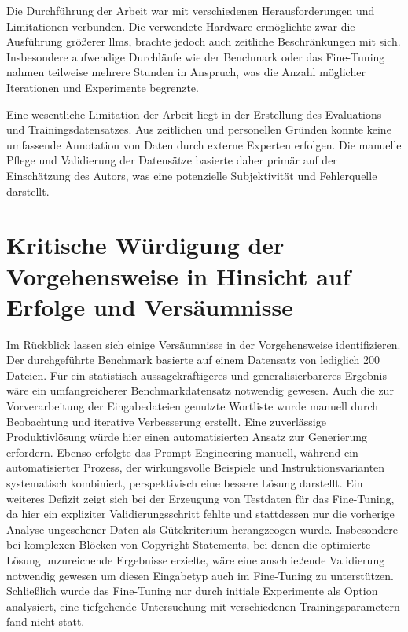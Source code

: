 Die Durchführung der Arbeit war mit verschiedenen Herausforderungen und Limitationen verbunden.
Die verwendete Hardware ermöglichte zwar die Ausführung größerer \glspl{llm}, brachte jedoch auch zeitliche Beschränkungen mit sich.
Insbesondere aufwendige Durchläufe wie der Benchmark oder das Fine-Tuning nahmen teilweise mehrere Stunden in Anspruch, was die Anzahl möglicher Iterationen und Experimente begrenzte.

Eine wesentliche Limitation der Arbeit liegt in der Erstellung des Evaluations- und Trainingsdatensatzes.
Aus zeitlichen und personellen Gründen konnte keine umfassende Annotation von Daten durch externe Experten erfolgen.
Die manuelle Pflege und Validierung der Datensätze basierte daher primär auf der Einschätzung des Autors, was eine potenzielle Subjektivität und Fehlerquelle darstellt.


\section{Kritische Würdigung der Vorgehensweise in Hinsicht auf Erfolge und Versäumnisse}

Im Rückblick lassen sich einige Versäumnisse in der Vorgehensweise identifizieren.
Der durchgeführte Benchmark basierte auf einem Datensatz von lediglich \num{200} Dateien.
Für ein statistisch aussagekräftigeres und generalisierbareres Ergebnis wäre ein umfangreicherer Benchmarkdatensatz notwendig gewesen.
Auch die zur Vorverarbeitung der Eingabedateien genutzte Wortliste wurde manuell durch Beobachtung und iterative Verbesserung erstellt.
Eine zuverlässige Produktivlösung würde hier einen automatisierten Ansatz zur Generierung erfordern.
Ebenso erfolgte das Prompt-Engineering manuell, während ein automatisierter Prozess, der wirkungsvolle Beispiele und Instruktionsvarianten systematisch kombiniert, perspektivisch eine bessere Lösung darstellt.
Ein weiteres Defizit zeigt sich bei der Erzeugung von Testdaten für das Fine-Tuning, da hier ein expliziter Validierungsschritt fehlte und stattdessen nur die vorherige Analyse ungesehener Daten als Gütekriterium herangzeogen wurde.
Insbesondere bei komplexen Blöcken von Copyright-Statements, bei denen die optimierte Lösung unzureichende Ergebnisse erzielte, wäre eine anschließende Validierung notwendig gewesen um diesen Eingabetyp auch im Fine-Tuning zu unterstützen.
Schließlich wurde das Fine-Tuning nur durch initiale Experimente als Option analysiert, eine tiefgehende Untersuchung mit verschiedenen Trainingsparametern fand nicht statt.

